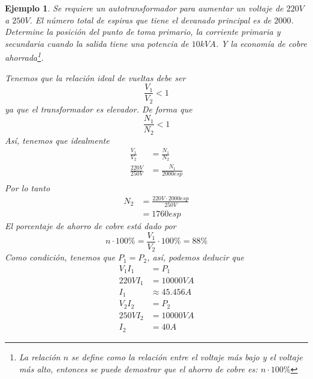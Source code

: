 \documentclass[11pt]{report}
\newtheorem{example}{Ejemplo}[section]
\begin{document}
\begin{example}
  Se requiere un autotransformador para aumentar un voltaje de $220V$ a
  $250V$.
  El número total de espiras que tiene el devanado principal es de
  $2000$. Determine
  la posición del punto de toma primario, la corriente primaria y
  secundaria cuando
  la salida tiene una potencia de $10{kVA}$. Y la economía de cobre
  ahorrada\footnote{La
    relación $n$ se define como la relación entre el voltaje más bajo y el
    voltaje más alto,
    entonces se puede demostrar que el ahorro de cobre es: $n\cdot100\%$}.

  Tenemos que la relación ideal de vueltas debe ser
  \begin{equation}
    \frac{V_1}{V_2} < 1
  \end{equation}
  ya que el transformador es elevador. De forma que
  \begin{equation}
    \frac{N_1}{N_2} < 1
  \end{equation}
  Así, tenemos que idealmente
  \begin{equation}
    \begin{split}
      \frac{V_1}{V_2} &= \frac{N_1}{N_2} \\
      \frac{220V}{250V} &= \frac{N_1}{2000esp} \\
    \end{split}
  \end{equation}
  Por lo tanto
  \begin{equation}
    \begin{split}
      N_2 &= \frac{220 V \cdot 2000esp}{250V} \\&= 1760 esp
    \end{split}
  \end{equation}
  El porcentaje de ahorro de cobre está dado por
  \begin{equation}
    n\cdot 100\% = \frac{V_1}{V_2}\cdot 100\% = 88\%
  \end{equation}
  Como condición, tenemos que $P_1 = P_2$, así, podemos deducir que
  \begin{equation}
    \begin{split}
      V_1 I_1 &= P_1 \\
      220V I_1 &= 10000VA \\
      I_1 &\approx 45.456A
    \end{split}
  \end{equation}
  \begin{equation}
    \begin{split}
      V_2 I_2 &= P_2 \\
      250V I_2 &= 10000VA \\
      I_2 &= 40A
    \end{split}
  \end{equation}
\end{example}
\end{document}
